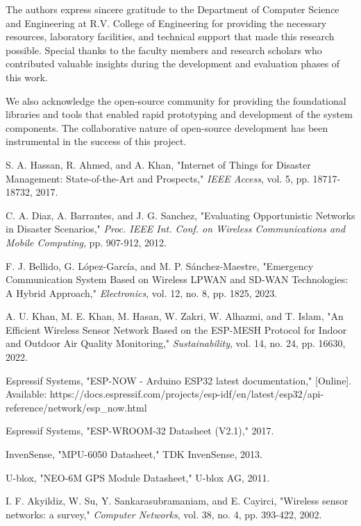\documentclass[conference]{IEEEtran}
\begin{document}
The authors express sincere gratitude to the Department of Computer Science and Engineering at R.V. College of Engineering for providing the necessary resources, laboratory facilities, and technical support that made this research possible. Special thanks to the faculty members and research scholars who contributed valuable insights during the development and evaluation phases of this work.

We also acknowledge the open-source community for providing the foundational libraries and tools that enabled rapid prototyping and development of the system components. The collaborative nature of open-source development has been instrumental in the success of this project.

\begin{thebibliography}{00}
 S. A. Hassan, R. Ahmed, and A. Khan, "Internet of Things for Disaster Management: State-of-the-Art and Prospects," \textit{IEEE Access}, vol. 5, pp. 18717-18732, 2017.

 C. A. Diaz, A. Barrantes, and J. G. Sanchez, "Evaluating Opportunistic Networks in Disaster Scenarios," \textit{Proc. IEEE Int. Conf. on Wireless Communications and Mobile Computing}, pp. 907-912, 2012.

 F. J. Bellido, G. López-García, and M. P. Sánchez-Maestre, "Emergency Communication System Based on Wireless LPWAN and SD-WAN Technologies: A Hybrid Approach," \textit{Electronics}, vol. 12, no. 8, pp. 1825, 2023.

 A. U. Khan, M. E. Khan, M. Hasan, W. Zakri, W. Alhazmi, and T. Islam, "An Efficient Wireless Sensor Network Based on the ESP-MESH Protocol for Indoor and Outdoor Air Quality Monitoring," \textit{Sustainability}, vol. 14, no. 24, pp. 16630, 2022.

 Espressif Systems, "ESP-NOW - Arduino ESP32 latest documentation," [Online]. Available: https://docs.espressif.com/projects/esp-idf/en/latest/esp32/api-reference/network/esp\_now.html

 Espressif Systems, "ESP-WROOM-32 Datasheet (V2.1)," 2017.

 InvenSense, "MPU-6050 Datasheet," TDK InvenSense, 2013.

 U-blox, "NEO-6M GPS Module Datasheet," U-blox AG, 2011.

 I. F. Akyildiz, W. Su, Y. Sankarasubramaniam, and E. Cayirci, "Wireless sensor networks: a survey," \textit{Computer Networks}, vol. 38, no. 4, pp. 393-422, 2002.


\end{thebibliography}
\end{document}
